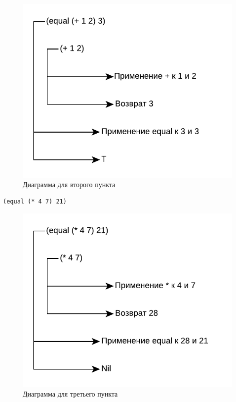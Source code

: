 \begin{figure}[H]
    \centering
    \includegraphics[scale=0.85]{data/pdf/task_2.pdf}
    \caption{Диаграмма для второго пункта}
\end{figure}

\begin{lstlisting}
(equal (* 4 7) 21)
\end{lstlisting}

\begin{figure}[H]
    \centering
    \includegraphics[scale=0.85]{data/pdf/task_3.pdf}
    \caption{Диаграмма для третьего пункта}
\end{figure}

